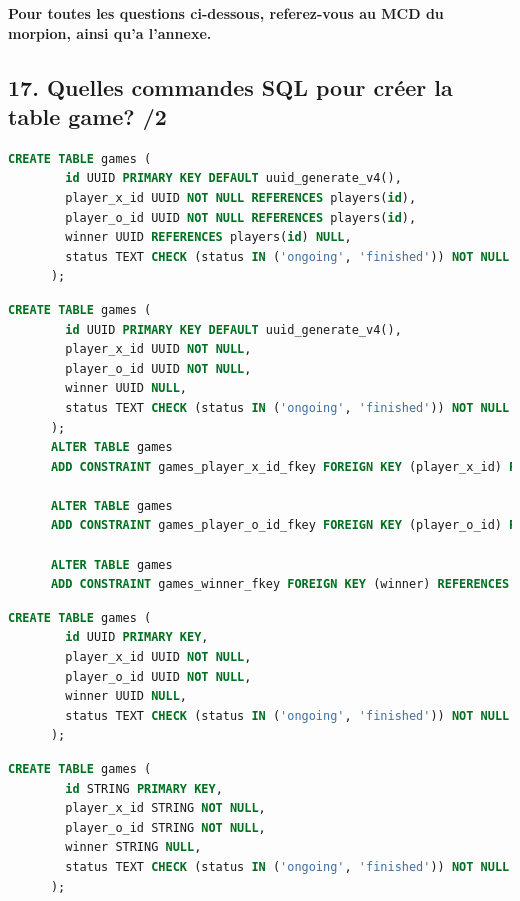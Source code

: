 \documentclass[12pt,a4paper]{article}
\begin{document}
\begin{flushleft}
{\large \textbf{Pour toutes les questions ci-dessous, referez-vous au MCD du morpion, ainsi qu'a l'annexe.}}

\subsection*{17. Quelles commandes SQL pour créer la table game? /2}
\begin{choices}
  \item \hspace{1cm} \begin{lstlisting}[language=SQL]
    CREATE TABLE games (
        id UUID PRIMARY KEY DEFAULT uuid_generate_v4(),
        player_x_id UUID NOT NULL REFERENCES players(id),
        player_o_id UUID NOT NULL REFERENCES players(id),
        winner UUID REFERENCES players(id) NULL,
        status TEXT CHECK (status IN ('ongoing', 'finished')) NOT NULL
      );
  \end{lstlisting}

  \item \hspace{1cm} \begin{lstlisting}[language=SQL]
      CREATE TABLE games (
        id UUID PRIMARY KEY DEFAULT uuid_generate_v4(),
        player_x_id UUID NOT NULL,
        player_o_id UUID NOT NULL,
        winner UUID NULL,
        status TEXT CHECK (status IN ('ongoing', 'finished')) NOT NULL
      );
      ALTER TABLE games
      ADD CONSTRAINT games_player_x_id_fkey FOREIGN KEY (player_x_id) REFERENCES players(id);

      ALTER TABLE games
      ADD CONSTRAINT games_player_o_id_fkey FOREIGN KEY (player_o_id) REFERENCES players(id);

      ALTER TABLE games
      ADD CONSTRAINT games_winner_fkey FOREIGN KEY (winner) REFERENCES players(id);

  \end{lstlisting}

  \item \hspace{1cm} \begin{lstlisting}[language=SQL]
      CREATE TABLE games (
        id UUID PRIMARY KEY,
        player_x_id UUID NOT NULL,
        player_o_id UUID NOT NULL,
        winner UUID NULL,
        status TEXT CHECK (status IN ('ongoing', 'finished')) NOT NULL
      );
  \end{lstlisting}

  \item \hspace{1cm} \begin{lstlisting}[language=SQL]
      CREATE TABLE games (
        id STRING PRIMARY KEY,
        player_x_id STRING NOT NULL,
        player_o_id STRING NOT NULL,
        winner STRING NULL,
        status TEXT CHECK (status IN ('ongoing', 'finished')) NOT NULL
      );
  \end{lstlisting}


\end{choices}
\end{flushleft}
\end{document}
